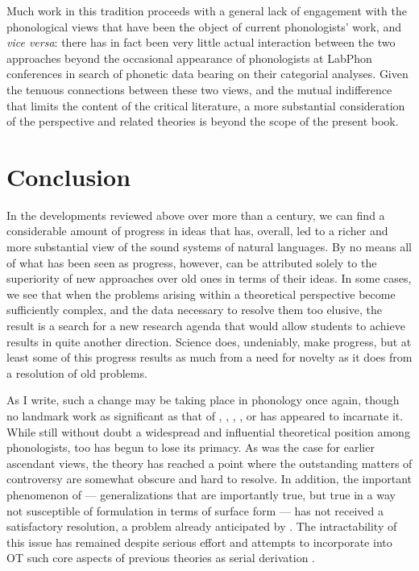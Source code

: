 Much work in this tradition proceeds with a general lack of engagement
with the phonological views that have been the object of current
phonologists' work, and \emph{vice versa}: there has in fact been very
little actual interaction between the two approaches beyond the
occasional appearance of phonologists at LabPhon conferences in search
of phonetic data bearing on their categorial analyses.  Given the
tenuous connections between these two views, and the mutual
indifference that limits the content of the critical literature, a
more substantial consideration of the  perspective
and related theories is beyond the scope of the present book.



\section{Conclusion}
\label{sec:conclusion}

In the developments reviewed above over more than a century, we can
find a considerable amount of progress in ideas that has, overall, led
to a richer and more substantial view of the sound systems of natural
languages. By no means all of what has been seen as progress, however,
can be attributed solely to the superiority of new approaches over old
ones in terms of their ideas. In some cases, we see that when the
problems arising within a theoretical perspective become sufficiently
complex, and the data necessary to resolve them too elusive, the
result is a search for a new research agenda that would allow students
to achieve results in quite another direction.  Science does,
undeniably, make progress, but at least some of this progress results
as much from a need for novelty as it does from a resolution of old
problems.

As I write, such a {change} may be taking place in phonology once again,
though no landmark work as significant as that of
\citet{saussure16:cours-original}, \citet{trubetzkoy39:grundzuge},
\citet{bloomfield:lg}, \citet{harris:methods}, \citet{spe} or
\citet{prince:smolensky04:ot} has appeared to incarnate it. While
still without doubt a widespread and influential theoretical position
among phonologists,  too has begun to lose its
primacy. As was the case for earlier ascendant views, the theory has
reached a point where the outstanding matters of controversy are
somewhat obscure and hard to resolve. In addition, the important
phenomenon of  --- generalizations that are importantly true,
but true in a way not susceptible of formulation in terms of surface
form --- has not received a satisfactory resolution, a problem already
anticipated by \citet{burzio_rise_1995}.  The intractability of this
issue has remained despite serious effort and attempts to incorporate
into OT such core aspects of previous theories  as serial derivation
\citep{mccarthy07:ot-cc}.

